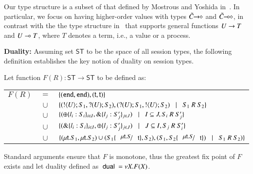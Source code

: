 Our type structure is a subset of that defined by Mostrous and Yoshida in~\cite{tlca07}.
In particular, we focus on having higher-order values with types
$\tilde{C}\!\! \rightarrow\!\! \diamond$ and $\tilde{C}\!\! \multimap\!\! \diamond$, in contrast with the the type structure
in~\cite{tlca07} that supports general functions
$U \rightarrow T$ and 
$U \multimap T$, where $T$ denotes a term, i.e., a value or a process.


{\bf Duality: }
Assuming set $\mathsf{ST}$ to be the space of all session types,
the following definition establishes the key notion of duality on session types.
%
\begin{definition}[Duality]\rm
	Let function $F(R): \mathsf{ST} \longrightarrow \mathsf{ST}$ to be defined as:

	\begin{tabular}{rcl}
		$F(R)$ &$=$&		$\{(\mathtt{end}, \mathtt{end}), (\mathsf{t}, \mathsf{t})\}$\\
			&$\cup$&	$\set{(\btout{U} S_1, \btinp{U} S_2), (\btinp{U} S_1, \btout{U} S_2) \bnfbar S_1\ R\ S_2}$\\
			&$\cup$&	$\{(\oplus \{l_i: S_i\}_{i \in I}, \& \{l_j: S_j'\}_{j \in J}) \;\;\;|\;\;\; I \subseteq J, S_i\ R\ S_j'\}$\\
			&$\cup$&	$\{(\& \{l_i: S_i\}_{i \in I}, \oplus \{l_j: S_j'\}_{j \in J}) \;\;\;|\;\;\; J \subseteq I, S_j\ R\ S_i'\}$\\
			&$\cup$&	$\set{(\trec{t}{S_1}, \trec{t}{S_2}) \cup (S_1 \subst{\trec{t}{S}}{\vart{t}}, S_2), (S_1, S_2\subst{\trec{t}{S}}{\vart{t}}) \bnfbar S_1\ R\ S_2)}$
	\end{tabular}
	
\noindent
	Standard arguments ensure that $F$ is monotone, thus the greatest fix point
	of $F$ exists and let duality defined as $\ \mathsf{dual}\  = \nu X. F(X)$.
\end{definition}
%



